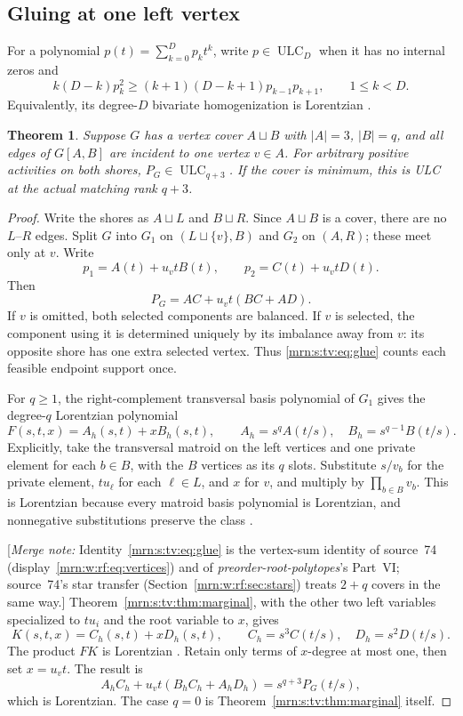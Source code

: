 \documentclass[11pt,a4paper]{article}
\newtheorem{theorem}{Theorem}[section]
\theoremstyle{remark}\newtheorem{remark}[theorem]{Remark}
\newcommand{\ULC}{\operatorname{ULC}}      %
\newcommand{\mnote}[1]{[\textit{Merge note:} #1]}
\newcommand{\prp}{\emph{preorder-root-polytopes}}
\begin{document}
\subsection{Gluing at one left vertex}
For a polynomial $p(t)=\sum_{k=0}^D p_kt^k$, write $p\in\ULC_D$ when it has
no internal zeros and
\[
 k(D-k)p_k^2\ge(k+1)(D-k+1)p_{k-1}p_{k+1},
 \qquad 1\le k<D.
\]
Equivalently, its degree-$D$ bivariate homogenization is Lorentzian
\cite[Example 2.26]{b:BH}.

\begin{theorem}\label{mrn:s:tv:thm:star}
Suppose $G$ has a vertex cover $A\sqcup B$ with $|A|=3$, $|B|=q$, and all
edges of $G[A,B]$ are incident to one vertex $v\in A$. For arbitrary positive
activities on both shores, $P_G\in\ULC_{q+3}$. If the cover is minimum, this is
ULC at the actual matching rank $q+3$.
\end{theorem}

\begin{proof}
Write the shores as $A\sqcup L$ and $B\sqcup R$. Since $A\sqcup B$ is a
cover, there are no $L$--$R$ edges. Split $G$ into $G_1$ on
$(L\sqcup\{v\},B)$ and $G_2$ on $(A,R)$; these meet only at $v$.
Write
\[
 p_1=A(t)+u_vtB(t),\qquad p_2=C(t)+u_vtD(t).
\]
Then
\begin{equation}\label{mrn:s:tv:eq:glue}
 P_G=AC+u_vt(BC+AD).
\end{equation}
If $v$ is omitted, both selected components are balanced. If $v$ is selected,
the component using it is determined uniquely by its imbalance away from $v$:
its opposite shore has one extra selected vertex. Thus \eqref{mrn:s:tv:eq:glue} counts
each feasible endpoint support once.

For $q\ge1$, the right-complement transversal basis polynomial of $G_1$ gives
the degree-$q$ Lorentzian polynomial
\[
 F(s,t,x)=A_h(s,t)+xB_h(s,t),\qquad
 A_h=s^qA(t/s),\quad B_h=s^{q-1}B(t/s).
\]
Explicitly, take the transversal matroid on the left vertices and one private
element for each $b\in B$, with the $B$ vertices as its $q$ slots. Substitute
$s/v_b$ for the private element, $t u_\ell$ for each $\ell\in L$, and $x$
for $v$, and multiply by $\prod_{b\in B}v_b$.
This is Lorentzian because every matroid basis polynomial is Lorentzian,
and nonnegative substitutions preserve the class \cite[Theorems 3.10 and 2.10]{b:BH}.

\mnote{Identity~\eqref{mrn:s:tv:eq:glue} is the vertex-sum identity of source~74 (display~\eqref{mrn:w:rf:eq:vertices}) and of \prp's Part~VI; source~74's star transfer (Section~\ref{mrn:w:rf:sec:stars}) treats $2+q$ covers in the same way.}
Theorem~\ref{mrn:s:tv:thm:marginal}, with the other two left variables specialized to
$t u_i$ and the root variable to $x$, gives
\[
 K(s,t,x)=C_h(s,t)+xD_h(s,t),\qquad
 C_h=s^3C(t/s),\quad D_h=s^2D(t/s).
\]
The product $FK$ is Lorentzian \cite[Corollary 2.32]{b:BH}. Retain only terms
of $x$-degree at most one, then set $x=u_vt$. The result is
\[
 A_hC_h+u_vt(B_hC_h+A_hD_h)
       =s^{q+3}P_G(t/s),
\]
which is Lorentzian. The case $q=0$ is Theorem~\ref{mrn:s:tv:thm:marginal} itself.
\end{proof}
\end{document}
